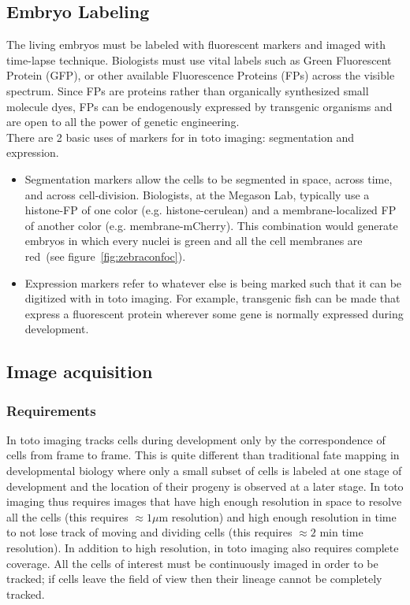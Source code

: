 \subsection{Embryo Labeling}

The living embryos must be labeled with fluorescent markers and imaged with
time-lapse technique. Biologists must use vital labels such as Green
Fluorescent Protein (GFP), or other available Fluorescence Proteins (FPs) across
the visible spectrum. Since FPs are proteins rather than organically synthesized
small molecule dyes, FPs can be endogenously expressed by transgenic organisms
and are open to all the power of genetic engineering.\\

There are 2 basic uses of markers for in toto imaging: segmentation and
expression.
\begin{itemize}
 \item Segmentation markers allow the cells to be segmented in space,
across time, and across cell-division. Biologists, at the Megason Lab, typically
use a histone-FP of one color (e.g. histone-cerulean) and a membrane-localized
FP of another color (e.g. membrane-mCherry). This combination would generate
embryos in which every nuclei is green and all the cell membranes are red~(see
figure~\ref{fig:zebraconfoc}).
 \item Expression markers refer to whatever else is being marked such that it
can be digitized with in toto imaging. For example, transgenic fish can be made
that express a fluorescent protein wherever some gene is normally expressed
during development.
\end{itemize}


\subsection{Image acquisition}

\subsubsection{Requirements}

In toto imaging tracks cells during development only by the correspondence of
cells from frame to frame. This is quite different than traditional fate mapping
in developmental biology where only a small subset of cells is labeled at one
stage of development and the location of their progeny is observed at a
later stage. In toto imaging thus requires images that have high enough
resolution in space to resolve all the cells (this requires $\approx
1 \mu$m resolution) and high enough resolution in time to not lose track of
moving and dividing cells (this requires $\approx 2$ min time resolution). In
addition to high resolution, in toto imaging also requires complete coverage.
All the cells of interest must be continuously imaged in order to be tracked; if
cells leave the field of view then their lineage cannot be completely tracked.


